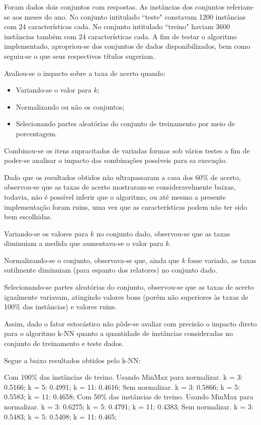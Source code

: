 \documentclass[12pt]{article}
\begin{document}
		Foram dados dois conjuntos com respostas. As instâncias dos conjuntos referiam-se aos meses do ano. No conjunto intitulado ``teste" constavam 1200 instâncias com 24 características cada. No conjunto intitulado ``treino" haviam 3600 instâncias também com 24 características cada. A fim de testar o algoritmo implementado, apropriou-se dos conjuntos de dados disponibilizados, bem como seguiu-se o que seus respectivos títulos sugeriam.

		Avaliou-se o impacto sobre a taxa de acerto quando:

		\begin{itemize}
			\item Variando-se o valor para $k$;
			\item Normalizando ou não os conjuntos;
			\item Selecionando partes aleatórias do conjunto de treinamento por meio de porcentagem.
		\end{itemize}

		Combinou-se os itens supracitados de variadas formas sob vários testes a fim de poder-se analisar o impacto das combinações possíveis para sa execução.
		
		Dado que os resultados obtidos não ultrapassaram a casa dos 60\% de acerto, observou-se que as taxas de acerto 
		mostraram-se consideravelmente baixas, todavia, não é possível inferir que o algoritmo, ou até mesmo a presente implementação foram ruins, uma vez que as características podem não ter sido bem escolhidas.

		Variando-se os valores para $k$ no conjunto dado, observou-se que as taxas diminuiam a medida que aumentava-se o valor para $k$.

		Normalizando-se o conjunto, observava-se que, ainda que $k$ fosse variado, as taxas sutilmente diminuiam (para espanto dos relatores) no conjunto dado.

		Selecionando-se partes aleatórias do conjunto, observou-se que as taxas de acerto igualmente variavam, atingindo valores bons (porém não superiores às taxas de 100\% das instâncias) e valores ruins.

		Assim, dado o fator estocástico não pôde-se avaliar com precisão o impacto direto para o algoritmo k-NN quanto a quantidade de instâncias consideradas no conjunto de treinamento e teste dados.

		Segue a baixo resultados obtidos pelo k-NN:

		Com 100\% das instâncias de treino.
			Usando MinMax para normalizar.
				k = 3: 0.5166;
				k = 5: 0.4991;
				k = 11: 0.4616;
			Sem normalizar.
				k = 3: 0.5866;
				k = 5: 0.5583;
				k = 11: 0.4658;
		Com 50\% das instâncias de treino.
			Usando MinMax para normalizar.
				k = 3: 0.6275;
				k = 5: 0.4791;
				k = 11: 0.4383;
			Sem normalizar.
				k = 3: 0.5483;
				k = 5: 0.5408;
				k = 11: 0.465;
\end{document}
